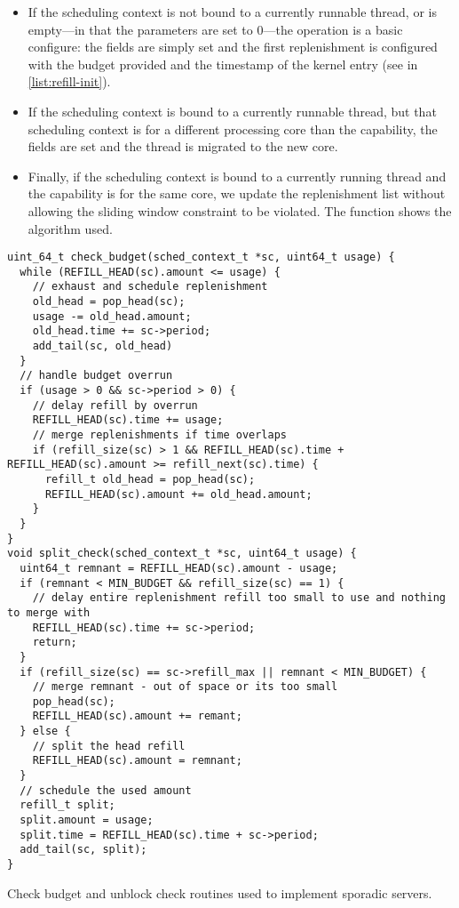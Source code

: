 \begin{itemize}
\item If the scheduling context is not bound
to a currently runnable thread, or is empty---in that the parameters are set to 0---the operation is 
a basic configure: the fields are
simply set and the first replenishment is configured with the budget provided and the timestamp of the
kernel entry (see  in \cref{list:refill-init}).
\item If the scheduling context is bound to a currently runnable thread, but that scheduling
context is for a different processing core than the \schedcontrol capability, the fields are
set and the thread is migrated to the new core.  
\item Finally, if the scheduling context is bound to a currently running thread and the
    \schedcontrol capability is for the same core, we update the replenishment list without
    allowing the sliding window constraint to be violated. The function  shows the
    algorithm used.
\end{itemize}

\begin{listing}[b!]
\begin{verbatim}
uint_64_t check_budget(sched_context_t *sc, uint64_t usage) {
  while (REFILL_HEAD(sc).amount <= usage) {
    // exhaust and schedule replenishment
    old_head = pop_head(sc);
    usage -= old_head.amount;
    old_head.time += sc->period;
    add_tail(sc, old_head)
  }
  // handle budget overrun
  if (usage > 0 && sc->period > 0) {
    // delay refill by overrun
    REFILL_HEAD(sc).time += usage;
    // merge replenishments if time overlaps
    if (refill_size(sc) > 1 && REFILL_HEAD(sc).time + REFILL_HEAD(sc).amount >= refill_next(sc).time) {
      refill_t old_head = pop_head(sc);
      REFILL_HEAD(sc).amount += old_head.amount;
    }
  }
}
void split_check(sched_context_t *sc, uint64_t usage) {
  uint64_t remnant = REFILL_HEAD(sc).amount - usage;
  if (remnant < MIN_BUDGET && refill_size(sc) == 1) {
    // delay entire replenishment refill too small to use and nothing to merge with
    REFILL_HEAD(sc).time += sc->period;
    return;
  }
  if (refill_size(sc) == sc->refill_max || remnant < MIN_BUDGET) {
    // merge remnant - out of space or its too small
    pop_head(sc);
    REFILL_HEAD(sc).amount += remant;
  } else {
    // split the head refill
    REFILL_HEAD(sc).amount = remnant;
  }
  // schedule the used amount
  refill_t split;
  split.amount = usage;
  split.time = REFILL_HEAD(sc).time + sc->period;
  add_tail(sc, split);
}
\end{verbatim}
\caption[Check budget and unblock check routines.]{Check budget and unblock check routines used to implement sporadic servers.}
\label{list:check}
\end{listing}
